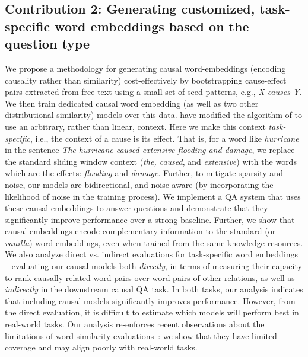 \subsection{Contribution 2: Generating customized, task-specific word embeddings based on the question type} We propose a methodology for generating causal word-embeddings (encoding causality rather than similarity) cost-effectively by bootstrapping cause-effect pairs extracted from free text using a small set of seed patterns, e.g., {\em X causes Y}. 
We then train dedicated causal word embedding (as well as two other distributional similarity) models over this data. \citet{levy2014dependency} have modified the algorithm of\citet{mikolov2013distributed} to use an arbitrary, rather than linear, context. Here we make this context \emph{task-specific}, i.e., the context of a cause is its effect.  That is, for a word like \emph{hurricane} in the sentence \emph{The hurricane caused extensive flooding and damage}, we replace the standard sliding window context (\emph{the, caused}, and \emph{extensive}) with the words which are the effects: \emph{flooding} and \emph{damage}. 
Further, to mitigate sparsity and noise, our models are bidirectional, and noise-aware (by incorporating the likelihood of noise in the training process). 
We implement a QA system that uses these causal embeddings to answer questions and demonstrate that they significantly improve performance over a strong baseline. Further, we show that causal embeddings encode complementary information to the standard (or \emph{vanilla}) word-embeddings, even when trained from the same knowledge resources. 
We also analyze direct vs. indirect evaluations for task-specific word embeddings -- evaluating our causal models both  {\em directly}, in terms of measuring their capacity to rank causally-related word pairs over word pairs of other relations, as well as {\em indirectly} in the downstream causal QA task. 
In both tasks, our analysis indicates that including causal models significantly improves performance. 
However, from the direct evaluation, it is difficult to estimate which models will perform best in real-world tasks. Our analysis re-enforces recent observations about the limitations of word similarity evaluations~\citep{faruqui2016problems}: we show that they have limited coverage and may align poorly with real-world tasks.

